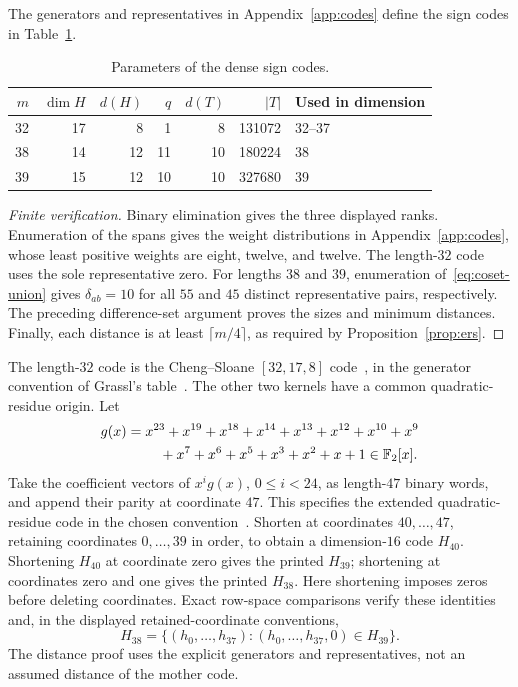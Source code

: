 \begin{proposition}\label{prop:signs}
The generators and representatives in Appendix~\ref{app:codes} define
the sign codes in Table~\ref{tab:signs}.
\end{proposition}
\begin{table}[ht]
\centering
\caption{Parameters of the dense sign codes.}
\label{tab:signs}
\begin{tabular}{rrrrrrl}
\toprule
$m$&$\dim H$&$d(H)$&$q$&$d(T)$&$|T|$&Used in dimension\\
\midrule
32&17&8&1&8&131072&32--37\\
38&14&12&11&10&180224&38\\
39&15&12&10&10&327680&39\\
\bottomrule
\end{tabular}
\end{table}
\begin{proof}[Finite verification]
Binary elimination gives the three displayed ranks. Enumeration of
the spans gives the weight distributions in Appendix~\ref{app:codes},
whose least positive weights are eight, twelve, and twelve. The
length-$32$ code uses the sole representative zero. For lengths $38$
and $39$, enumeration of~\eqref{eq:coset-union} gives
$\delta_{ab}=10$ for all $55$ and $45$ distinct representative pairs,
respectively. The preceding difference-set argument proves the sizes
and minimum distances. Finally, each distance is at least
$\lceil m/4\rceil$, as required by Proposition~\ref{prop:ers}.
\end{proof}

The length-$32$ code is the Cheng--Sloane
$[32,17,8]$ code~\cite{chengsloane}, in the generator convention of
Grassl's table~\cite{grassl32}. The other two kernels have a common
quadratic-residue origin. Let
\begin{align}
 g(x)={}&x^{23}+x^{19}+x^{18}+x^{14}+x^{13}+x^{12}+x^{10}+x^9
 \nonumber\\
 &\quad+x^7+x^6+x^5+x^3+x^2+x+1\in\mathbb F_2[x].\label{eq:qr}
\end{align}
Take the coefficient vectors of $x^ig(x)$, $0\le i<24$, as
length-$47$ binary words, and append their parity at coordinate $47$.
This specifies the extended quadratic-residue code in the chosen
convention~\cite[Chapter~16]{macwilliams}. Shorten at coordinates
$40,\ldots,47$, retaining coordinates $0,\ldots,39$ in order, to
obtain a dimension-$16$ code $H_{40}$. Shortening $H_{40}$ at coordinate
zero gives the printed $H_{39}$; shortening at coordinates zero and
one gives the printed $H_{38}$. Here shortening imposes zeros before
deleting coordinates. Exact row-space comparisons verify these
identities and, in the displayed retained-coordinate conventions,
\begin{equation}\label{eq:nesting}
 H_{38}=\{(h_0,\ldots,h_{37}):(h_0,\ldots,h_{37},0)\in H_{39}\}.
\end{equation}
The distance proof uses the explicit generators and representatives,
not an assumed distance of the mother code.

